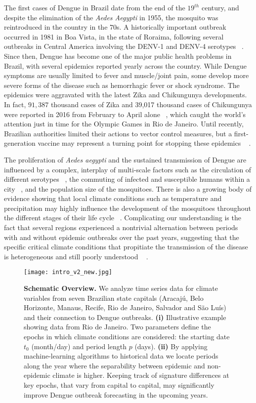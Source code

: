 \documentclass[final,leqno]{siamltexmm2}
\begin{document}
The first cases of Dengue in Brazil date from the end of the $19^{th}$ century, and despite the elimination of 
the \emph{Aedes Aegypti} in 1955, the mosquito was reintroduced in the country in the 70s. A historically important 
outbreak occurred in 1981 in Boa Vista, in the state of Roraima, following several outbreaks in Central America involving 
the DENV-1 and DENV-4 serotypes ~\cite{Figueredo, Fares}. Since then, Dengue has become one of the major public 
health problems in Brazil, with several epidemics reported yearly across the country. While Dengue symptoms are
 usually limited to fever and muscle/joint pain, some develop more severe forms of the disease such as hemorrhagic fever or shock 
syndrome. The epidemics were aggravated with the latest Zika and Chikungunya developments. In fact, 
$91,387$ thousand cases of Zika and 39,017 thousand cases of Chikungunya were reported in 2016 from 
February to April alone ~\cite{Saude}, which caught the world's attention just in time for the Olympic Games in Rio de Janeiro. Until recently, Brazilian authorities limited their actions to vector control measures, 
but a first-generation vaccine may represent a turning point for stopping these epidemics ~ \cite{who_vaccine,Rothman,Pitisuttithum}. 

The proliferation of \emph{Aedes aegypti} and the sustained transmission of Dengue are influenced by a complex, interplay of multi-scale factors such as the circulation of different serotypes ~\cite{Rabaa,Raghwani},
the commuting of infected and susceptible humans within a city 
~\cite{manbites,stoddard,stolerman},  and the 
population size of the mosquitoes. There is also a growing body of evidence showing that local climate conditions
such as temperature and precipitation may highly influence the development of the mosquitoes 
throughout the different stages of their life cycle ~\cite{Watts,Yang,Honorio,Hopp}. Complicating our understanding
is the fact that several regions experienced a nontrivial alternation between periods with and without epidemic outbreaks 
over the past years, suggesting that the specific critical climate conditions that propitiate the transmission of the disease is heterogeneous and 
still poorly understood ~ \cite{Adde,Hii, Descloux,Buczak2012,Buczak2014}. 

\begin{figure}[t]
\texttt{[image: intro\_v2\_new.jpg]}
\caption{ {\bf Schematic Overview.}
We analyze time series data for climate variables from seven Brazilian state capitals (Aracaj\'{u}, Belo Horizonte, Manaus, Recife, Rio de 
Janeiro, Salvador and S\~{a}o Lu\'{i}s) and their connection to Dengue outbreaks. {\bf(i)} Illustrative example showing data from Rio de Janeiro. 
Two parameters define the epochs in which climate conditions are considered: the starting date $t_0$ (month/day) and period length $p$ (days). {\bf(ii)} By applying machine-learning algorithms to historical data we locate periods along the year 
where the separability between epidemic and non-epidemic climate is higher. Keeping track of signature differences at key epochs, that 
vary from capital to capital, may significantly improve Dengue outbreak forecasting in the upcoming years. }
\label{Schematic_Overview}
\end{figure}
\end{document}
